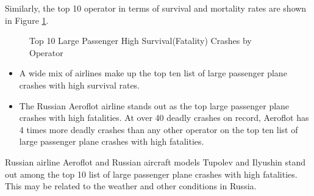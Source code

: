 \documentclass[12pt]{article}
\begin{document}
Similarly, the top 10 operator in terms of survival and mortality rates are shown in Figure \ref{fig:Op10}. 
\begin{figure}[htp]
    \centering
    \caption{Top 10 Large Passenger High Survival(Fatality) Crashes by Operator}
    \label{fig:Op10}
\end{figure}
\begin{itemize}
    \item A wide mix of airlines make up the top ten list of large passenger plane crashes with high survival rates. 
    \item The Russian Aeroflot airline stands out as the top large passenger plane crashes with high fatalities. At over 40 deadly crashes on record, Aeroflot has 4 times more deadly crashes than any other operator on the top ten list of large passenger plane crashes with high fatalities. 
\end{itemize}
Russian airline Aeroflot and Russian aircraft models Tupolev and Ilyushin stand out among the top 10 list of large passenger plane crashes with high fatalities. This may be related to the weather and other conditions in Russia.
\end{document}
